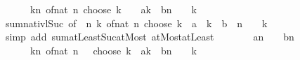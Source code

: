 \begin{isabellebody}
\ \ \ \ \ \ {\isacharparenleft}{\kern0pt}{\isasymSum}k{\isacharequal}{\kern0pt}{}{\isachardot}{\kern0pt}{\isachardot}{\kern0pt}n{\isachardot}{\kern0pt}\ of{\isacharunderscore}{\kern0pt}nat\ {\isacharparenleft}{\kern0pt}n\ choose\ {\isacharparenleft}{\kern0pt}k\ {\isacharminus}{\kern0pt}\ {}{\isacharparenright}{\kern0pt}{\isacharparenright}{\kern0pt}\ {\isacharasterisk}{\kern0pt}\ a{\isacharcircum}{\kern0pt}k\ {\isacharasterisk}{\kern0pt}\ b{\isacharcircum}{\kern0pt}{\isacharparenleft}{\kern0pt}n\ {\isacharplus}{\kern0pt}\ {}\ {\isacharminus}{\kern0pt}\ k{\isacharparenright}{\kern0pt}{\isacharparenright}{\kern0pt}{\isacharparenright}{\kern0pt}{\isachardoublequoteclose}\isanewline
\ \ \ \ \ \ \isamarkupfalse%
\ sum{\isachardot}{\kern0pt}nat{\isacharunderscore}{\kern0pt}ivl{\isacharunderscore}{\kern0pt}Suc{\isacharprime}{\kern0pt}\ {\isacharbrackleft}{\kern0pt}of\ {}\ n\ {\isachardoublequoteopen}{\isasymlambda}k{\isachardot}{\kern0pt}\ of{\isacharunderscore}{\kern0pt}nat\ {\isacharparenleft}{\kern0pt}n\ choose\ {\isacharparenleft}{\kern0pt}k{\isacharminus}{\kern0pt}{}{\isacharparenright}{\kern0pt}{\isacharparenright}{\kern0pt}\ {\isacharasterisk}{\kern0pt}\ a\ {\isacharcircum}{\kern0pt}\ k\ {\isacharasterisk}{\kern0pt}\ b\ {\isacharcircum}{\kern0pt}\ {\isacharparenleft}{\kern0pt}n\ {\isacharplus}{\kern0pt}\ {}\ {\isacharminus}{\kern0pt}\ k{\isacharparenright}{\kern0pt}{\isachardoublequoteclose}{\isacharbrackright}{\kern0pt}\isanewline
\ \ \ \ \isamarkupfalse%
\ {\isacharparenleft}{\kern0pt}simp\ add{\isacharcolon}{\kern0pt}\ sum{\isachardot}{\kern0pt}atLeast{\isacharunderscore}{\kern0pt}Suc{\isacharunderscore}{\kern0pt}atMost\ atMost{\isacharunderscore}{\kern0pt}atLeast{}{\isacharparenright}{\kern0pt}\isanewline
\ \ \isamarkupfalse%
\ \isamarkupfalse%
\ {\isachardoublequoteopen}{\isasymdots}\ {\isacharequal}{\kern0pt}\ a{\isacharcircum}{\kern0pt}{\isacharparenleft}{\kern0pt}n\ {\isacharplus}{\kern0pt}\ {}{\isacharparenright}{\kern0pt}\ {\isacharplus}{\kern0pt}\ b{\isacharcircum}{\kern0pt}{\isacharparenleft}{\kern0pt}n\ {\isacharplus}{\kern0pt}\ {}{\isacharparenright}{\kern0pt}\ {\isacharplus}{\kern0pt}\isanewline
\ \ \ \ \ \ {\isacharparenleft}{\kern0pt}{\isasymSum}k{\isacharequal}{\kern0pt}{}{\isachardot}{\kern0pt}{\isachardot}{\kern0pt}n{\isachardot}{\kern0pt}\ of{\isacharunderscore}{\kern0pt}nat\ {\isacharparenleft}{\kern0pt}n\ {\isacharplus}{\kern0pt}\ {}\ choose\ k{\isacharparenright}{\kern0pt}\ {\isacharasterisk}{\kern0pt}\ a{\isacharcircum}{\kern0pt}k\ {\isacharasterisk}{\kern0pt}\ b{\isacharcircum}{\kern0pt}{\isacharparenleft}{\kern0pt}n\ {\isacharplus}{\kern0pt}\ {}\ {\isacharminus}{\kern0pt}\ k{\isacharparenright}{\kern0pt}{\isacharparenright}{\kern0pt}{\isachardoublequoteclose}\isanewline

\end{isabellebody}
